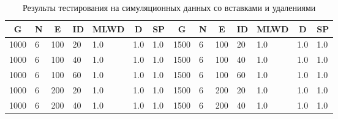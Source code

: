 \begin{table}[H]
\caption{Результы тестирования на симуляционных данных со вставками и удалениями}
\label{table:with_indel_results}
\begin{tabular}{|l|l|l|l|l|l|l|l|l|l|l|l|l|l|}
\hline
\multicolumn{1}{|c|}{G} & \multicolumn{1}{c|}{N} & \multicolumn{1}{c|}{E} & \multicolumn{1}{c|}{ID} & \multicolumn{1}{c|}{MLWD} & \multicolumn{1}{c|}{D} & \multicolumn{1}{c|}{SP} & \multicolumn{1}{c|}{G} & \multicolumn{1}{c|}{N} & \multicolumn{1}{c|}{E} & \multicolumn{1}{c|}{ID} & \multicolumn{1}{c|}{MLWD} & \multicolumn{1}{c|}{D} & \multicolumn{1}{c|}{SP} \\ \hline
1000                    & 6                      & 100                    & 20                      & 1.0                       & 1.0                    & 1.0                     & 1500                   & 6                      & 100                    & 20                      & 1.0                       & 1.0                    & 1.0                     \\ \hline
1000                    & 6                      & 100                    & 40                      & 1.0                       & 1.0                    & 1.0                     & 1500                   & 6                      & 100                    & 40                      & 1.0                       & 1.0                    & 1.0                     \\ \hline
1000                    & 6                      & 100                    & 60                      & 1.0                       & 1.0                    & 1.0                     & 1500                   & 6                      & 100                    & 60                      & 1.0                       & 1.0                    & 1.0                     \\ \hline
1000                    & 6                      & 200                    & 20                      & 1.0                       & 1.0                    & 1.0                     & 1500                   & 6                      & 200                    & 20                      & 1.0                       & 1.0                    & 1.0                     \\ \hline
1000                    & 6                      & 200                    & 40                      & 1.0                       & 1.0                    & 1.0                     & 1500                   & 6                      & 200                    & 40                      & 1.0                       & 1.0                    & 1.0                     \\ \hline

\end{tabular}
\end{table}
